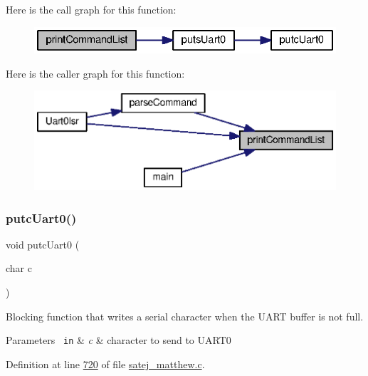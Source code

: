 Here is the call graph for this function\+:\nopagebreak
\begin{figure}[H]
\begin{center}
\leavevmode
\includegraphics[width=329pt]{satej__matthew_8c_a9657c6b2d1c183503ca49b71da13e9e4_cgraph}
\end{center}
\end{figure}
Here is the caller graph for this function\+:\nopagebreak
\begin{figure}[H]
\begin{center}
\leavevmode
\includegraphics[width=346pt]{satej__matthew_8c_a9657c6b2d1c183503ca49b71da13e9e4_icgraph}
\end{center}
\end{figure}
\mbox{\label{satej__matthew_8c_a27ebab6950bfb65d641dd04feb03906f}} 
\subsubsection{\texorpdfstring{putcUart0()}{putcUart0()}}
{\footnotesize\ttfamily void putc\+Uart0 (\begin{DoxyParamCaption}\item[{char}]{c }\end{DoxyParamCaption})}



Blocking function that writes a serial character when the U\+A\+RT buffer is not full. 


\begin{DoxyParams}[1]{Parameters}
\mbox{\texttt{ in}}  & {\em c} & character to send to U\+A\+R\+T0 \\
\hline
\end{DoxyParams}


Definition at line \mbox{\hyperlink{satej__matthew_8c_source_l00720}{720}} of file \mbox{\hyperlink{satej__matthew_8c_source}{satej\+\_\+matthew.\+c}}.

